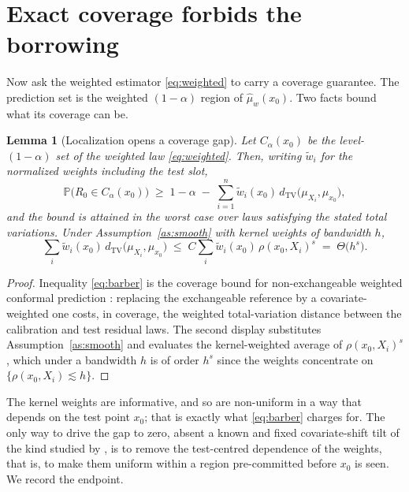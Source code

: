\documentclass[11pt]{article}
\newtheorem{lemma}[theorem]{Lemma}
\theoremstyle{definition}
\theoremstyle{remark}
\newcommand{\Prob}{\mathbb{P}}
\newcommand{\TV}{\mathrm{TV}}
\newcommand{\dtv}{d_{\TV}}
\begin{document}
\section{Exact coverage forbids the borrowing}

Now ask the weighted estimator \eqref{eq:weighted} to carry a coverage guarantee. The
prediction set is the weighted $(1-\alpha)$ region of $\widehat\mu_{w}(x_0)$. Two facts
bound what its coverage can be.

\begin{lemma}[Localization opens a coverage gap]\label{lem:gap}
Let $C_\alpha(x_0)$ be the level-$(1-\alpha)$ set of the weighted law
\eqref{eq:weighted}. Then, writing $\widetilde w_i$ for the normalized weights including
the test slot,
\begin{equation}\label{eq:barber}
  \Prob\big(R_0 \in C_\alpha(x_0)\big)
  \;\ge\; 1-\alpha \;-\; \sum_{i=1}^{n} \widetilde w_i(x_0)\,
  \dtv\big(\mu_{X_i},\mu_{x_0}\big),
\end{equation}
and the bound is attained in the worst case over laws satisfying the stated total
variations. Under Assumption~\ref{as:smooth} with kernel weights of bandwidth $h$,
\[
  \sum_{i} \widetilde w_i(x_0)\, \dtv\big(\mu_{X_i},\mu_{x_0}\big)
  \;\le\; C \sum_i \widetilde w_i(x_0)\, \rho(x_0,X_i)^{s}
  \;=\; \Theta\big(h^{s}\big).
\]
\end{lemma}

\begin{proof}
Inequality \eqref{eq:barber} is the coverage bound for non-exchangeable weighted
conformal prediction \citep{barber2023beyond}: replacing the exchangeable reference by a
covariate-weighted one costs, in coverage, the weighted total-variation distance between
the calibration and test residual laws. The second display substitutes
Assumption~\ref{as:smooth} and evaluates the kernel-weighted average of
$\rho(x_0,X_i)^{s}$, which under a bandwidth $h$ is of order $h^{s}$ since the weights
concentrate on $\{\rho(x_0,X_i)\lesssim h\}$.
\end{proof}

The kernel weights are informative, and so are non-uniform in a way that depends on the
test point $x_0$; that is exactly what \eqref{eq:barber} charges for. The only way to
drive the gap to zero, absent a known and fixed covariate-shift tilt of the kind studied
by \citet{tibshirani2019conformal}, is to remove the test-centred dependence of the
weights, that is, to make them uniform within a region pre-committed before $x_0$ is
seen. We record the endpoint.
\end{document}
